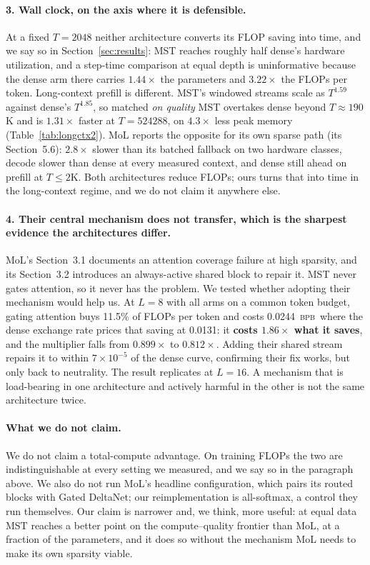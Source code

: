\documentclass{article}
\newcommand{\bpb}{\textsc{bpb}}
\begin{document}
\paragraph{3. Wall clock, on the axis where it is defensible.} At a fixed
$T{=}2048$ neither architecture converts its FLOP saving into time, and we say so
in Section~\ref{sec:results}: MST reaches roughly half dense's hardware
utilization, and a step-time comparison at equal depth is uninformative because
the dense arm there carries $1.44\times$ the parameters and $3.22\times$ the
FLOPs per token. Long-context prefill is different. MST's windowed streams scale
as $T^{1.59}$ against dense's $T^{1.85}$, so matched \emph{on quality} MST
overtakes dense beyond $T{\approx}190$K and is $1.31\times$ faster at
$T{=}524288$, on $4.3\times$ less peak memory (Table~\ref{tab:longctx2}). MoL reports the opposite for its own
sparse path (its Section~5.6): $2.8\times$ slower than its batched fallback on
two hardware classes, decode slower than dense at every measured context, and
dense still ahead on prefill at $T\!\leq\!2$K. Both architectures reduce FLOPs;
ours turns that into time in the long-context regime, and we do not claim it
anywhere else.

\paragraph{4. Their central mechanism does not transfer, which is the sharpest
evidence the architectures differ.} MoL's Section~3.1 documents an attention
coverage failure at high sparsity, and its Section~3.2 introduces an always-active
shared block to repair it. MST never gates attention, so it never has the problem.
We tested whether adopting their mechanism would help us. At $L{=}8$ with all arms
on a common token budget, gating attention buys 11.5\% of FLOPs per token and costs
0.0244~\bpb\ where the dense exchange rate prices that saving at 0.0131: it
\textbf{costs $1.86\times$ what it saves}, and the multiplier falls from
$0.899\times$ to $0.812\times$. Adding their shared stream repairs it to within
$7\times10^{-5}$ of the dense curve, confirming their fix works, but only back to
neutrality. The result replicates at $L{=}16$. A mechanism that is load-bearing in
one architecture and actively harmful in the other is not the same architecture
twice.

\paragraph{What we do not claim.} We do not claim a total-compute advantage. On
training FLOPs the two are indistinguishable at every setting we measured, and we
say so in the paragraph above. We also do not run MoL's headline configuration,
which pairs its routed blocks with Gated DeltaNet; our reimplementation is
all-softmax, a control they run themselves. Our claim is narrower and, we think,
more useful: at equal data MST reaches a better point on the compute--quality
frontier than MoL, at a fraction of the parameters, and it does so without the
mechanism MoL needs to make its own sparsity viable.
\end{document}
